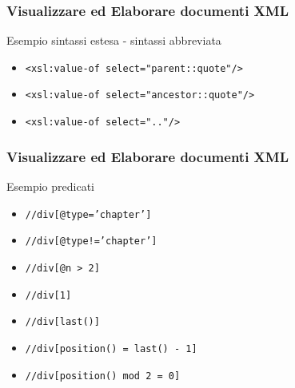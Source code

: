 \begin{frame}
    \frametitle{Visualizzare ed Elaborare documenti XML}
    \addtocounter{nframe}{1}
    

    \begin{block}{Esempio sintassi estesa - sintassi abbreviata}
        \begin{itemize}
            \item \texttt{<xsl:value-of select="parent::quote"/>}
            \item \texttt{<xsl:value-of select="ancestor::quote"/>}
            \item \texttt{<xsl:value-of select=".."/>}
        \end{itemize}
    \end{block}

\end{frame}

\begin{frame}
    \frametitle{Visualizzare ed Elaborare documenti XML}
    \addtocounter{nframe}{1}
    

    \begin{block}{Esempio predicati}
        \begin{itemize}
            \item \texttt{//div[@type='chapter']}
            \item \texttt{//div[@type!='chapter']}
            \item \texttt{//div[@n > 2]}
            \item \texttt{//div[1]}
            \item \texttt{//div[last()]}
            \item \texttt{//div[position() = last() - 1]}
            \item \texttt{//div[position() mod 2 = 0]}
        \end{itemize}
    \end{block}

\end{frame}

